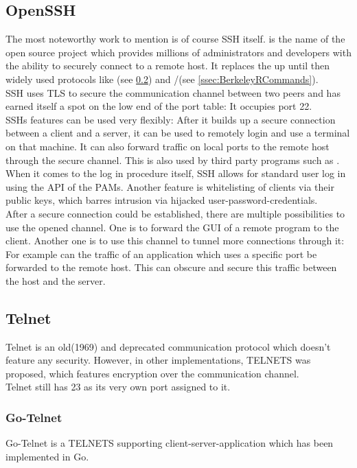 \documentclass[10pt,a4paper,titlepage,twoside,english,final]{zhawreprt}
\begin{document}
\subsection{OpenSSH}\label{ssec:OpenSSH}
The most noteworthy work to mention is of course \gls{SSH} itself. \cite{openssh} is the name of the open source project which provides millions of administrators and developers with the ability to securely connect to a remote host. It replaces the up until then widely used protocols like \cite{telnet}(see \ref{ssec:Telnet}) and \cite{rlogin}/\cite{rsh}(see \ref{ssec:BerkeleyRCommands}).\\
\gls{SSH} uses \gls{TLS} to secure the communication channel between two peers and has earned itself a spot on the low end of the \gls{port} table: It occupies \gls{port} 22.\\
\gls{SSH}s features can be used very flexibly: After it builds up a secure connection between a client and a server, it can be used to remotely login and use a \gls{terminal} on that machine.
It can also forward traffic on local ports to the remote host through the secure channel. This is also used by third party programs such as \cite{rsync}.\\
When it comes to the log in procedure itself, \gls{SSH} allows for standard user log in using the \gls{API} of the \glspl{PAM}. Another feature is whitelisting of clients via their public keys, which barres intrusion via hijacked user-password-credentials.\\
After a secure connection could be established, there are multiple possibilities to use the opened channel. One is to forward the \gls{GUI} of a remote program to the client. Another one is to use this channel to tunnel more connections through it: For example can the traffic of an application which uses a specific \gls{port} be forwarded to the remote host. This can obscure and secure this traffic between the host and the server.

\subsection{Telnet}\label{ssec:Telnet}
Telnet\citep{rfc15,rfc854} is an old(1969) and deprecated communication protocol which doesn't feature any security. However, in other implementations, \gls{TELNETS} was proposed, which features encryption over the communication channel.\\
Telnet still has 23 as its very own \gls{port} assigned to it.
\subsubsection{Go-Telnet}
Go-Telnet\citep{gotelnet} is a \gls{TELNETS} supporting client-server-application which has been implemented in \gls{Go}.
\end{document}
